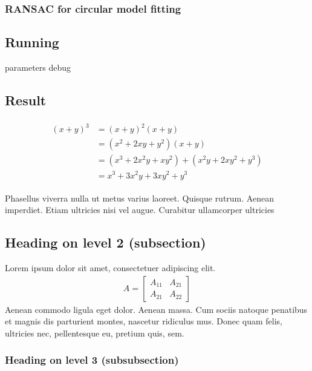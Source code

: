 \documentclass[paper=a4, fontsize=11pt]{scrartcl} %
\numberwithin{equation}{section} %
\numberwithin{figure}{section} %
\numberwithin{table}{section} %
\begin{document}
\subsubsection{RANSAC for circular model fitting}



\subsection{Running}

parameters
debug


\subsection{Result}

\begin{align} 
\begin{split}
(x+y)^3 	&= (x+y)^2(x+y)\\
&=(x^2+2xy+y^2)(x+y)\\
&=(x^3+2x^2y+xy^2) + (x^2y+2xy^2+y^3)\\
&=x^3+3x^2y+3xy^2+y^3
\end{split}					
\end{align}

Phasellus viverra nulla ut metus varius laoreet. Quisque rutrum. Aenean imperdiet. Etiam ultricies nisi vel augue. Curabitur ullamcorper ultricies


\subsection{Heading on level 2 (subsection)}

Lorem ipsum dolor sit amet, consectetuer adipiscing elit. 
\begin{align}
A = 
\begin{bmatrix}
A_{11} & A_{21} \\
A_{21} & A_{22}
\end{bmatrix}
\end{align}
Aenean commodo ligula eget dolor. Aenean massa. Cum sociis natoque penatibus et magnis dis parturient montes, nascetur ridiculus mus. Donec quam felis, ultricies nec, pellentesque eu, pretium quis, sem.


\subsubsection{Heading on level 3 (subsubsection)}
\end{document}
